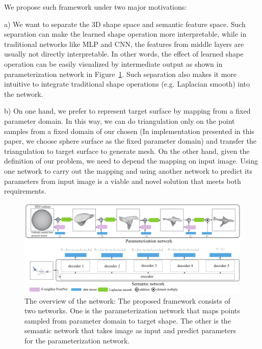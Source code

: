 We propose such framework under two major motivations:

a) We want to separate the 3D shape space and semantic feature space. Such separation can make the learned shape operation more interpretable, while in traditional networks like MLP and CNN, the features from middle layers are usually not directly interpretable. In other words, the effect of learned shape operation can be easily visualized by intermediate output as shown in parameterization network in Figure~\ref{fig:overview}. Such separation also makes it more intuitive to integrate traditional shape operations (e.g. Laplacian smooth) into the network.

b) On one hand, we prefer to represent target surface by mapping from a fixed parameter domain. In this way, we can do triangulation only on the point samples from a fixed domain of our chosen (In implementation presented in this paper, we choose sphere surface as the fixed parameter domain) and transfer the triangulation to target surface to generate mesh. On the other hand, given the definition of our problem, we need to depend the mapping on input image. Using one network to carry out the mapping and using another network to predict its parameters from input image is a viable and novel solution that meets both requirements.

\begin{figure}[htbp]
	\centering
	\includegraphics[width=\linewidth]{img/net/overview}
	\caption{The overview of the network: The proposed framework consists of two networks. One is the parameterization network that maps points sampled from parameter domain to target shape. The other is the semantic network that takes image as input and predict parameters for the parameterization network.}
	\label{fig:overview}
\end{figure}

